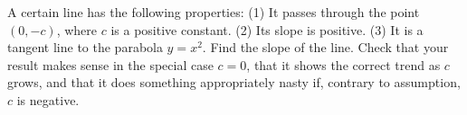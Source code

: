 A certain line has the following properties: (1) It passes through the point $(0,-c)$, where $c$ is
a positive constant. (2) Its slope is positive. (3) It is a tangent line to the parabola $y=x^2$.
Find the slope of the line. Check that your result makes sense in the special case $c=0$, that
it shows the correct trend as $c$ grows, and that it does something appropriately nasty if, contrary
to assumption, $c$ is negative.
\answercheck
